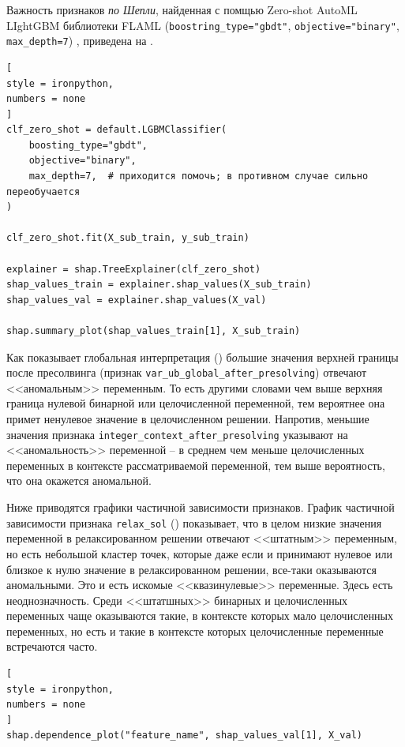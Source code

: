 \documentclass[%
	11pt,
	a4paper,
	utf8,
		]{article}
\begin{document}
Важность признаков \emph{по Шепли}, найденная с помщью Zero-shot AutoML LIghtGBM библиотеки FLAML (\verb|boostring_type="gbdt"|, \verb|objective="binary"|, \verb|max_depth=7|) , приведена на .

\begin{lstlisting}[
style = ironpython,
numbers = none
]
clf_zero_shot = default.LGBMClassifier(
	boosting_type="gbdt",
	objective="binary",
	max_depth=7,  # приходится помочь; в противном случае сильно переобучается
)

clf_zero_shot.fit(X_sub_train, y_sub_train)

explainer = shap.TreeExplainer(clf_zero_shot)
shap_values_train = explainer.shap_values(X_sub_train)
shap_values_val = explainer.shap_values(X_val)

shap.summary_plot(shap_values_train[1], X_sub_train)
\end{lstlisting}

Как показывает глобальная интерпретация () б\emph{о}льшие значения верхней границы после пресолвинга (признак \texttt{var\_ub\_global\_after\_presolving}) отвечают <<аномальным>> переменным. То есть другими словами чем выше верхняя граница нулевой бинарной или целочисленной переменной, тем вероятнее она примет ненулевое значение в целочисленном решении. Напротив, меньшие значения признака \texttt{integer\_context\_after\_presolving} указывают на <<аномальность>> переменной -- в среднем чем меньше целочисленных переменных в контексте рассматриваемой переменной, тем выше вероятность, что она окажется аномальной.

Ниже приводятся графики частичной зависимости признаков. График частичной зависимости признака \verb|relax_sol| () показывает, что в целом низкие значения переменной в релаксированном решении отвечают <<штатным>> переменным, но есть небольшой кластер точек, которые даже если и принимают нулевое или близкое к нулю значение в релаксированном решении, все-таки оказываются аномальными. Это и есть искомые <<квазинулевые>> переменные. Здесь есть неоднозначность. Среди <<штатшных>> бинарных и целочисленных переменных чаще оказываются такие, в контексте которых мало целочисленных переменных, но есть и такие в контексте которых целочисленные переменные встречаются часто.

\begin{lstlisting}[
style = ironpython,
numbers = none	
]
shap.dependence_plot("feature_name", shap_values_val[1], X_val)
\end{lstlisting}
\end{document}
